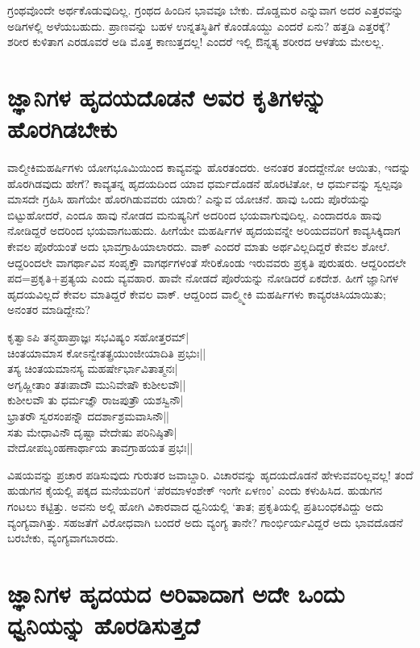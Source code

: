 ಗ್ರಂಥವೊಂದೇ ಅರ್ಥಕೊಡುವುದಿಲ್ಲ. ಗ್ರಂಥದ ಹಿಂದಿನ ಭಾವವೂ ಬೇಕು. ದೊಡ್ಡಮರ ಎನ್ನುವಾಗ ಅದರ ಎತ್ತರವನ್ನು ಅಡಿಗಳಲ್ಲಿ ಅಳೆಯಬಹುದು. ಪ್ರಾಣವನ್ನು ಬಹಳ ಉನ್ನತಸ್ಥಿತಿಗೆ ಕೊಂಡೊಯ್ದು ಎಂದರೆ ಏನು? ಹತ್ತಡಿ ಎತ್ತರಕ್ಕೆ? ಶರೀರ ಕುಳಿತಾಗ ಎರಡೂವರೆ ಅಡಿ ಮೊತ್ತ ಕಾಣುತ್ತದಲ್ಲ! ಎಂದರೆ ಇಲ್ಲಿ ಔನ್ನತ್ಯ ಶರೀರದ ಆಳತೆಯ ಮೇಲಲ್ಲ. 

\section*{ಜ್ಞಾನಿಗಳ ಹೃದಯದೊಡನೆ ಅವರ ಕೃತಿಗಳನ್ನು ಹೊರಗಿಡಬೇಕು}

ವಾಲ್ಮೀಕಿಮಹರ್ಷಿಗಳು ಯೋಗಭೂಮಿಯಿಂದ ಕಾವ್ಯವನ್ನು ಹೊರತಂದರು. ಅನಂತರ ತಂದದ್ದೇನೋ ಆಯಿತು, ಇದನ್ನು ಹೊರಗಿಡವುದು ಹೇಗೆ? ಕಾವ್ಯತನ್ನ ಹೃದಯದಿಂದ ಯಾವ ಧರ್ಮದೊಡನೆ ಹೊರಟಿತೋ, ಆ ಧರ್ಮವನ್ನು ಸ್ವಲ್ಪವೂ ಮಾಸದೇ ಗ್ರಹಿಸಿ ಹಾಗೆಯೇ ಹೊರಗಿಡುವವರು ಯಾರು? ಎನ್ನುವ ಯೋಚನೆ. ಹಾವು ಒಂದು ಪೊರೆಯನ್ನು ಬಿಟ್ಟುಹೋದರೆ, ಎಂದೂ ಹಾವು ನೋಡದ ಮನುಷ್ಯನಿಗೆ ಅದರಿಂದ ಭಯವಾಗುವುದಿಲ್ಲ. ಎಂದಾದರೂ ಹಾವು ನೋಡಿದ್ದರೆ ಅದರಿಂದ ಭಯವಾಗಬಹುದು. ಹೀಗೆಯೇ ಮಹರ್ಷಿಗಳ ಹೃದಯವನ್ನೇ ಅರಿಯದವರಿಗೆ ಕಾವ್ಯಸಿಕ್ಕಿದಾಗ ಕೇವಲ ಪೊರೆಯಂತೆ ಅದು ಭಾವಗ್ರಾಹಿಯಾಲಾರದು. ವಾಕ್ ಎಂದರೆ ಮಾತು ಅರ್ಥವಿಲ್ಲದಿದ್ದರೆ ಕೇವಲ ಶೋಲೆ. ಆದ್ದರಿಂದಲೇ ವಾಗರ್ಥಾವಿವ ಸಂಪೃಕ್ತೌ ವಾಗರ್ಥಗಳಂತೆ\label{238} ಸೇರಿಕೊಂಡು ಇರುವವರು ಪ್ರಕೃತಿ ಪುರುಷರು. ಆದ್ದರಿಂದಲೇ ಪದ=ಪ್ರಕೃತಿ+ಪ್ರತ್ಯಯ ಎಂದು ವ್ಯವಹಾರ. ಹಾವೇ ನೋಡದೆ ಪೊರೆಯನ್ನು ನೋಡಿದರೆ ಏಕದೇಶ. ಹೀಗೆ ಜ್ಞಾನಿಗಳ ಹೃದಯವಿಲ್ಲದೆ ಕೇವಲ ಮಾತಿದ್ದರೆ ಕೇವಲ ವಾಕ್. ಆದ್ದರಿಂದ ವಾಲ್ಮ್ಮೀಕಿ ಮಹರ್ಷಿಗಳು ಕಾವ್ಯರಚಿಸಿಯಾಯಿತು; ಅನಂತರ ಮಾಡಿದ್ದೇನು? 

\begin{shloka}
ಕೃತ್ವಾಽಪಿ ತನ್ಮಹಾಪ್ರಾಜ್ಞಃ ಸಭವಿಷ್ಯಂ ಸಹೋತ್ತರಮ್|\label{238}\\
ಚಿಂತಯಾಮಾಸ ಕೋಽನ್ವೇತತ್ಪ್ರಯುಂಜೀಯಾದಿತಿ ಪ್ರಭುಃ||\\
ತಸ್ಯ ಚಿಂತಯಮಾನಸ್ಯ ಮಹರ್ಷೇರ್ಭಾವಿತಾತ್ಮನಃ|\\
ಅಗೃಹ್ಣೀತಾಂ ತತಃಪಾದೌ ಮುನಿವೇಷೌ ಕುಶೀಲವೌ||\\
ಕುಶೀಲವೌ ತು ಧರ್ಮಜ್ಞೌ ರಾಜಪುತ್ರೌ ಯಶಸ್ವಿನೌ|\\
ಭ್ರಾತರೌ ಸ್ವರಸಂಪನ್ನೌ ದದರ್ಶಾಶ್ರಮವಾಸಿನೌ||\\
ಸತು ಮೇಧಾವಿನೌ ದೃಷ್ಟಾ ವೇದೇಷು ಪರಿನಿಷ್ಠಿತೌ|\\
ವೇದೋಪಬೃಂಹಣಾರ್ಥಾಯ ತಾವಗ್ರಾಹಯತ ಪ್ರಭಃ||
\end{shloka}

ವಿಷಯವನ್ನು ಪ್ರಚಾರ ಪಡಿಸುವುದು ಗುರುತರ ಜವಾಬ್ದಾರಿ. ವಿಚಾರವನ್ನು ಹೃದಯದೊಡನೆ ಹೇಳುವವರಿಲ್ಲವಲ್ಲ! ತಂದೆ ಹುಡುಗನ ಕೈಯಲ್ಲಿ ಪಕ್ಕದ ಮನೆಯವರಿಗೆ `ಪೆರಮಾಳಂಶೇಕ್ ಇಂಗೇ ಏಳಣಂ' ಎಂದು ಕಳುಹಿಸಿದ. ಹುಡುಗನ ಗಂಟಲು ಕಟ್ಟಿತ್ತು. ಅವನು ಅಲ್ಲಿ ಹೋಗಿ ವಿಕಾರವಾದ ಧ್ವನಿಯಲ್ಲಿ `ತಾತ; ಪ್ರಕೃತಿಯಲ್ಲಿ ಪ್ರತಿಬಂಧಕವಿದ್ದು ಅದು ವ್ಯಂಗ್ಯವಾಗಿತ್ತು. ಸಹಜತೆಗೆ ವಿರೋಧವಾಗಿ ಬಂದರೆ ಅದು ವ್ಯಂಗ್ಯ ತಾನೇ? ಗಾಂರ್ಭಿರ್ಯವಿದ್ದರೆ ಅದು ಭಾವದೊಡನೆ ಬರಬೇಕು, ವ್ಯಂಗ್ಯವಾಗಬಾರದು.

\section*{ಜ್ಞಾನಿಗಳ ಹೃದಯದ ಅರಿವಾದಾಗ ಅದೇ ಒಂದು ಧ್ವನಿಯನ್ನು  ಹೊರಡಿಸುತ್ತದೆ}

